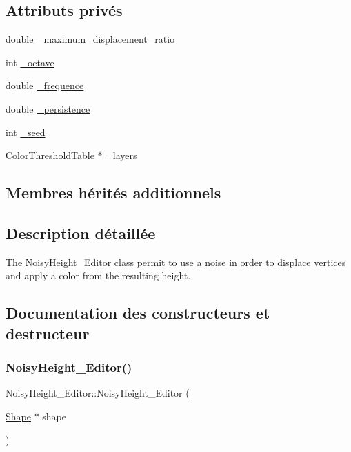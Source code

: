 \subsection*{Attributs privés}
\begin{DoxyCompactItemize}
\item 
double \hyperlink{class_noisy_height___editor_ae4a5069cc1a10e7fd9525648ac20c3b7}{\+\_\+maximum\+\_\+displacement\+\_\+ratio}
\item 
int \hyperlink{class_noisy_height___editor_af52b33d7a5ea98cdda1a1bc17d897d75}{\+\_\+octave}
\item 
double \hyperlink{class_noisy_height___editor_ac6b90169942b0bb92d6461dbf9a2e000}{\+\_\+frequence}
\item 
double \hyperlink{class_noisy_height___editor_aa0752875febd6605a9c0ecdf040c6f48}{\+\_\+persistence}
\item 
int \hyperlink{class_noisy_height___editor_a8765f88743f3ea7f2c850a9415060287}{\+\_\+seed}
\item 
\hyperlink{thresholdtable_8h_ab0deb49d07758f9814993774cb9935cc}{Color\+Threshold\+Table} $\ast$ \hyperlink{class_noisy_height___editor_a40ef1d409c9cbc17b24556b1072e43c1}{\+\_\+layers}
\end{DoxyCompactItemize}
\subsection*{Membres hérités additionnels}


\subsection{Description détaillée}
The \hyperlink{class_noisy_height___editor}{Noisy\+Height\+\_\+\+Editor} class permit to use a noise in order to displace vertices and apply a color from the resulting height. 

\subsection{Documentation des constructeurs et destructeur}
\mbox{\label{class_noisy_height___editor_ae4535fb17b29bd29d09dcadd5b9384e3}} 
\subsubsection{\texorpdfstring{Noisy\+Height\+\_\+\+Editor()}{NoisyHeight\_Editor()}\hspace{0.1cm}{\footnotesize\ttfamily [1/2]}}
{\footnotesize\ttfamily Noisy\+Height\+\_\+\+Editor\+::\+Noisy\+Height\+\_\+\+Editor (\begin{DoxyParamCaption}\item[{\hyperlink{class_shape}{Shape} $\ast$}]{shape }\end{DoxyParamCaption})}



